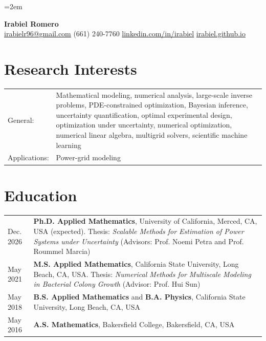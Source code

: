 \documentclass[11pt]{article}
\begin{document}
\emergencystretch=2em %

\begin{center}
  {\bfseries \Large Irabiel Romero} \\[0.1in]
  \href{mailto:irabielr96@gmail.com}{irabielr96@gmail.com} \quad
  (661) 240-7760 \quad
  \href{https://www.linkedin.com/in/irabiel}{linkedin.com/in/irabiel} \quad
  \href{https://irabiel.github.io}{irabiel.github.io}
\end{center}

\vskip 0.2in

\section*{Research Interests}

\noindent
\begin{tabular}{lp{}}
General: & Mathematical modeling, numerical analysis, large-scale
inverse problems, PDE-constrained optimization, Bayesian
inference, uncertainty
quantification, optimal experimental design, optimization under
uncertainty, numerical optimization, numerical linear algebra,
multigrid solvers, scientific machine learning \\
Applications: & Power-grid modeling
\end{tabular}

\section*{Education}

\vskip 0.1in
\noindent
\begin{tabular}{lp{}}
  Dec. 2026 & {\bf Ph.D. Applied Mathematics}, University of California,
  Merced, CA, USA (expected). Thesis: \emph{Scalable Methods
  for Estimation of Power Systems under Uncertainty} (Advisors: Prof.
  Noemi Petra and Prof. Roummel Marcia) \\
  May 2021 & {\bf M.S. Applied Mathematics}, California State
  University, Long Beach, CA, USA. Thesis: \emph{Numerical Methods for
  Multiscale Modeling in Bacterial Colony Growth} (Advisor: Prof. Hui Sun) \\
  May 2018 & {\bf B.S. Applied Mathematics} and {\bf B.A. Physics},
  California State University, Long Beach, CA, USA \\
  May 2016 & {\bf A.S. Mathematics}, Bakersfield College, Bakersfield,
  CA, USA
\end{tabular}
\end{document}

